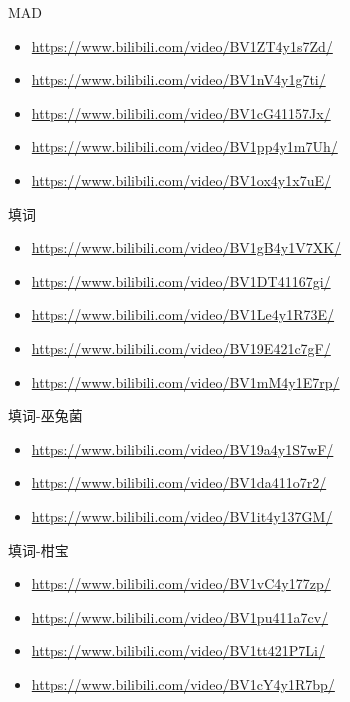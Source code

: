 \documentclass[a4paper]{article}
\begin{document}
MAD

\begin{itemize}
    \item \href{call of silence}{https://www.bilibili.com/video/BV1ZT4y1s7Zd/}
    \item \href{The Herrscher of Origin}{https://www.bilibili.com/video/BV1nV4y1g7ti/}
    \item \href{手书 Roads to Ride}{https://www.bilibili.com/video/BV1cG41157Jx/}
    \item \href{Evangel 星海余音 LAST STARDUST}{https://www.bilibili.com/video/BV1pp4y1m7Uh/}
    \item \href{神啊 暮色回响}{https://www.bilibili.com/video/BV1ox4y1x7uE/}
\end{itemize}

填词

\begin{itemize}
    \item \href{TruE 中文填词}{https://www.bilibili.com/video/BV1gB4y1V7XK/}
    \item \href{花}{https://www.bilibili.com/video/BV1DT41167gi/}
    \item \href{错位时空}{https://www.bilibili.com/video/BV1Le4y1R73E/}
    \item \href{暮色回响}{https://www.bilibili.com/video/BV19E421c7gF/}
    \item \href{爱酱在等你}{https://www.bilibili.com/video/BV1mM4y1E7rp/}
\end{itemize}

填词-巫兔菌

\begin{itemize}
    \item \href{不问别离}{https://www.bilibili.com/video/BV19a4y1S7wF/}
    \item \href{无瑕少女}{https://www.bilibili.com/video/BV1da411o7r2/}
    \item \href{水晶花的葬礼}{https://www.bilibili.com/video/BV1it4y137GM/}
\end{itemize}

填词-柑宝

\begin{itemize}
    \item \href{别让我担心}{https://www.bilibili.com/video/BV1vC4y177zp/}
    \item \href{她们本该如此浪漫的活着}{https://www.bilibili.com/video/BV1pu411a7cv/}
    \item \href{稻香}{https://www.bilibili.com/video/BV1tt421P7Li/}
    \item \href{二十七位女武神的告白}{https://www.bilibili.com/video/BV1cY4y1R7bp/}
\end{itemize}
\end{document}
